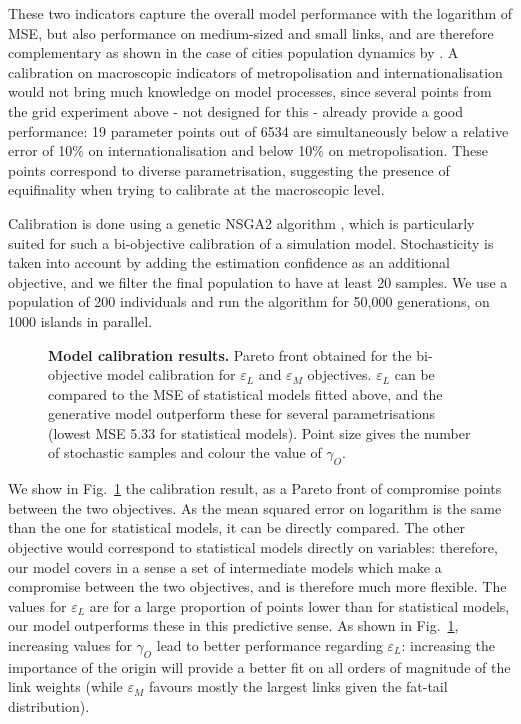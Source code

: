 \documentclass[10pt,letterpaper]{article}
\begin{document}
These two indicators capture the overall model performance with the logarithm of MSE, but also performance on medium-sized and small links, and are therefore complementary as shown in the case of cities population dynamics by \cite{raimbault2018indirect}. A calibration on macroscopic indicators of metropolisation and internationalisation would not bring much knowledge on model processes, since several points from the grid experiment above - not designed for this - already provide a good performance: 19 parameter points out of 6534 are simultaneously below a relative error of 10\% on internationalisation and below 10\% on metropolisation. These points correspond to diverse parametrisation, suggesting the presence of equifinality when trying to calibrate at the macroscopic level. 

Calibration is done using a genetic NSGA2 algorithm \cite{deb2002fast}, which is particularly suited for such a bi-objective calibration of a simulation model. Stochasticity is taken into account by adding the estimation confidence as an additional objective, and we filter the final population to have at least 20 samples. We use a population of 200 individuals and run the algorithm for 50,000 generations, on 1000 islands in parallel.


\begin{figure}
	\begin{center}
    \end{center}
	\caption{\textbf{Model calibration results.} Pareto front obtained for the bi-objective model calibration for $\varepsilon_L$ and $\varepsilon_M$ objectives. $\varepsilon_L$ can be compared to the MSE of statistical models fitted above, and the generative model outperform these for several parametrisations (lowest MSE 5.33 for statistical models). Point size gives the number of stochastic samples and colour the value of $\gamma_O$.\label{fig:fig8}}
\end{figure}


We show in Fig.~\ref{fig:fig8} the calibration result, as a Pareto front of compromise points between the two objectives. As the mean squared error on logarithm is the same than the one for statistical models, it can be directly compared. The other objective would correspond to statistical models directly on variables: therefore, our model covers in a sense a set of intermediate models which make a compromise between the two objectives, and is therefore much more flexible. The values for $\varepsilon_L$ are for a large proportion of points lower than for statistical models, our model outperforms these in this predictive sense. As shown in Fig.~\ref{fig:fig8}, increasing values for $\gamma_O$ lead to better performance regarding $\varepsilon_L$: increasing the importance of the origin will provide a better fit on all orders of magnitude of the link weights (while $\varepsilon_M$ favours mostly the largest links given the fat-tail distribution).
\end{document}
